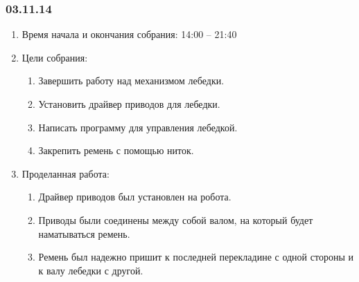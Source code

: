 	
\subsubsection{03.11.14}

\begin{enumerate}
	\item Время начала и окончания собрания:
	14:00 – 21:40
	\item Цели собрания:
	\begin{enumerate}
	  \item	Завершить работу над механизмом лебедки.
	  
	  \item	Установить драйвер приводов для лебедки.
	  
	  \item	Написать программу для управления лебедкой.
	  
	  \item	Закрепить ремень с помощью ниток.
	  
    \end{enumerate}
    
	\item Проделанная работа:
	\begin{enumerate}
	  \item	Драйвер приводов был установлен на робота.
      
      \item	Приводы были соединены между собой валом, на который будет наматываться ремень.
      
      \item	Ремень был надежно пришит к последней перекладине с одной стороны и к валу лебедки с другой.
      

\end{enumerate}
\end{enumerate}
